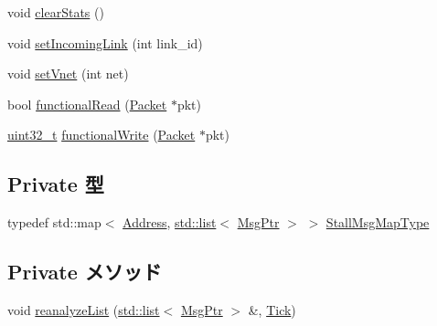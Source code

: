 \begin{DoxyCompactItemize}
\item 
void \hyperlink{classMessageBuffer_ac7ec7476159db4e2bb0372e30010fc9e}{clearStats} ()
\item 
void \hyperlink{classMessageBuffer_aee0eb866227b5e46be9a2c51c22bcb88}{setIncomingLink} (int link\_\-id)
\item 
void \hyperlink{classMessageBuffer_a528d693acf172c3acd1f7fbf73a463f9}{setVnet} (int net)
\item 
bool \hyperlink{classMessageBuffer_a729f57f557bb42c045c47d9388f1030e}{functionalRead} (\hyperlink{classPacket}{Packet} $\ast$pkt)
\item 
\hyperlink{Type_8hh_a435d1572bf3f880d55459d9805097f62}{uint32\_\-t} \hyperlink{classMessageBuffer_ad07b9def1d6f5e5f988a254c3a9d1ad9}{functionalWrite} (\hyperlink{classPacket}{Packet} $\ast$pkt)
\end{DoxyCompactItemize}
\subsection*{Private 型}
\begin{DoxyCompactItemize}
\item 
typedef std::map$<$ \hyperlink{classAddress}{Address}, \hyperlink{classstd_1_1list}{std::list}$<$ \hyperlink{classRefCountingPtr}{MsgPtr} $>$ $>$ \hyperlink{classMessageBuffer_a4f77caf961eb3357bbaa1534420e8213}{StallMsgMapType}
\end{DoxyCompactItemize}
\subsection*{Private メソッド}
\begin{DoxyCompactItemize}
\item 
void \hyperlink{classMessageBuffer_ac278f790c547f9db8b4bedc853b8ae63}{reanalyzeList} (\hyperlink{classstd_1_1list}{std::list}$<$ \hyperlink{classRefCountingPtr}{MsgPtr} $>$ \&, \hyperlink{base_2types_8hh_a5c8ed81b7d238c9083e1037ba6d61643}{Tick})
\end{DoxyCompactItemize}
